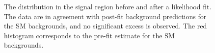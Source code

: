 \begin{figure}
\centering
\caption{The \MET distribution in the signal region before and after a likelihood fit. The data are in agreement with post-fit background predictions for the SM backgrounds, and no significant excess is observed. The red histogram corresponds to the pre-fit estimate for the SM backgrounds.}
\label{Fig_sr}
\end{figure}

